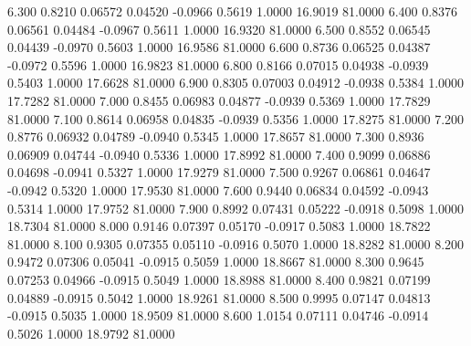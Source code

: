    6.300   0.8210   0.06572   0.04520  -0.0966   0.5619   1.0000  16.9019  81.0000
   6.400   0.8376   0.06561   0.04484  -0.0967   0.5611   1.0000  16.9320  81.0000
   6.500   0.8552   0.06545   0.04439  -0.0970   0.5603   1.0000  16.9586  81.0000
   6.600   0.8736   0.06525   0.04387  -0.0972   0.5596   1.0000  16.9823  81.0000
   6.800   0.8166   0.07015   0.04938  -0.0939   0.5403   1.0000  17.6628  81.0000
   6.900   0.8305   0.07003   0.04912  -0.0938   0.5384   1.0000  17.7282  81.0000
   7.000   0.8455   0.06983   0.04877  -0.0939   0.5369   1.0000  17.7829  81.0000
   7.100   0.8614   0.06958   0.04835  -0.0939   0.5356   1.0000  17.8275  81.0000
   7.200   0.8776   0.06932   0.04789  -0.0940   0.5345   1.0000  17.8657  81.0000
   7.300   0.8936   0.06909   0.04744  -0.0940   0.5336   1.0000  17.8992  81.0000
   7.400   0.9099   0.06886   0.04698  -0.0941   0.5327   1.0000  17.9279  81.0000
   7.500   0.9267   0.06861   0.04647  -0.0942   0.5320   1.0000  17.9530  81.0000
   7.600   0.9440   0.06834   0.04592  -0.0943   0.5314   1.0000  17.9752  81.0000
   7.900   0.8992   0.07431   0.05222  -0.0918   0.5098   1.0000  18.7304  81.0000
   8.000   0.9146   0.07397   0.05170  -0.0917   0.5083   1.0000  18.7822  81.0000
   8.100   0.9305   0.07355   0.05110  -0.0916   0.5070   1.0000  18.8282  81.0000
   8.200   0.9472   0.07306   0.05041  -0.0915   0.5059   1.0000  18.8667  81.0000
   8.300   0.9645   0.07253   0.04966  -0.0915   0.5049   1.0000  18.8988  81.0000
   8.400   0.9821   0.07199   0.04889  -0.0915   0.5042   1.0000  18.9261  81.0000
   8.500   0.9995   0.07147   0.04813  -0.0915   0.5035   1.0000  18.9509  81.0000
   8.600   1.0154   0.07111   0.04746  -0.0914   0.5026   1.0000  18.9792  81.0000
